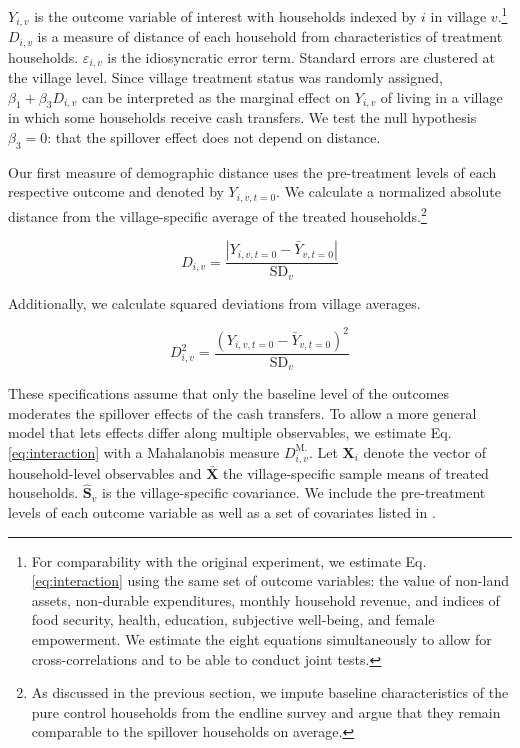 \documentclass[11pt]{article}
\begin{document}
        $Y_{i,v}$ is the outcome variable of interest with households indexed by $i$ in village $v$.\footnote{For comparability with the original experiment, we estimate Eq. \ref{eq:interaction} using the same set of outcome variables: the value of non-land assets, non-durable expenditures, monthly household revenue, and indices of food security, health, education, subjective well-being, and female empowerment. We estimate the eight equations simultaneously to allow for cross-correlations and to be able to conduct joint tests.} $D_{i,v}$ is a measure of distance of each household from characteristics of treatment households. $\varepsilon_{i,v}$ is the idiosyncratic error term. Standard errors are clustered at the village level. Since village treatment status was randomly assigned, $\beta_1 + \beta_3 D_{i,v}$ can be interpreted as the marginal effect on $Y_{i,v}$ of living in a village in which some households receive cash transfers. We test the null hypothesis $\beta_3 = 0$: that the spillover effect does not depend on distance.

        Our first measure of demographic distance uses the pre-treatment levels of each respective outcome and denoted by $Y_{i,v,t=0}$. We calculate a normalized absolute distance from the village-specific average of the treated households.\footnote{As discussed in the previous section, we impute baseline characteristics of the pure control households from the endline survey and argue that they remain comparable to the spillover households on average.}

            \begin{equation} \label{eq:sqdev}
            D_{i,v} = \frac{|Y_{i,v,t=0} - \bar Y_{v,t=0}|}{\text{SD}_v}
            \end{equation}

        Additionally, we calculate squared deviations from village averages.

            \begin{equation} \label{eq:sqdev}
            D^2_{i,v} = \frac{(Y_{i,v,t=0} - \bar Y_{v,t=0})^2}{\text{SD}_v}
            \end{equation}

        These specifications assume that only the baseline level of the outcomes moderates the spillover effects of the cash transfers. To allow a more general model that lets effects differ along multiple observables, we estimate Eq. \ref{eq:interaction} with a Mahalanobis measure $D^\text{M.}_{i,v}$. Let $\mathbf X_i$ denote the vector of household-level observables and $\mathbf{\bar X}$ the village-specific sample means of treated households. $\mathbf{\hat S}_v$ is the village-specific covariance. We include the pre-treatment levels of each outcome variable as well as a set of covariates listed in \textcite{haushofer_short-term_2016}.
\end{document}

